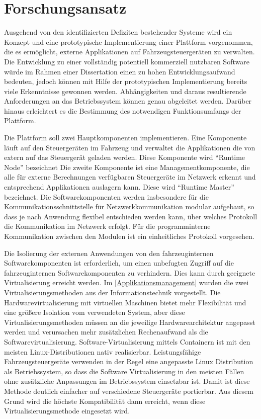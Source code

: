 \section{Forschungsansatz}
Ausgehend von den identifizierten Defiziten bestehender Systeme wird ein Konzept und eine prototypische Implementierung einer Plattform vorgenommen, die es ermöglicht, externe Applikationen auf Fahrzeugsteuergeräten zu verwalten. Die Entwicklung zu einer vollständig potentiell kommerziell nutzbaren Software würde im Rahmen einer Dissertation einen zu hohen Entwicklungsaufwand bedeuten, jedoch können mit Hilfe der prototypischen Implementierung bereits viele Erkenntnisse gewonnen werden. Abhängigkeiten und daraus resultierende Anforderungen an das Betriebssystem können genau abgeleitet werden. Darüber hinaus erleichtert es die Bestimmung des notwendigen Funktionsumfangs der Plattform. 

Die Plattform soll zwei Hauptkomponenten implementieren. Eine Komponente läuft auf den Steuergeräten im Fahrzeug und verwaltet die Applikationen die von extern auf das Steuergerät geladen werden. Diese Komponente wird \enquote{Runtime Node} bezeichnet Die zweite Komponente ist eine Managementkomponente, die alle für externe Berechnungen verfügbaren Steuergeräte im Netzwerk erkennt und entsprechend Applikationen auslagern kann. Diese wird \enquote{Runtime Master} bezeichnet. Die Softwarekomponenten werden insbesondere für die Kommunikationsschnittstelle für Netzwerkkommunikation modular aufgebaut, so dass je nach Anwendung flexibel entschieden werden kann, über welches Protokoll die Kommunikation im Netzwerk erfolgt. Für die programminterne Kommunikation zwischen den Modulen ist ein einheitliches Protokoll vorgesehen. 

Die Isolierung der externen Anwendungen von den fahrzeuginternen Softwarekomponenten ist erforderlich, um einen unbefugten Zugriff auf die fahrzeuginternen Softwarekomponenten zu verhindern. Dies kann durch geeignete Virtualisierung erreicht werden. Im \autoref{Applikationsmanagement} wurden die zwei Virtualisierungsmethoden aus der Informationstechnik vorgestellt. Die Hardwarevirtualisierung mit virtuellen Maschinen bietet mehr Flexibilität und eine größere Isolation vom verwendeten System, aber diese Virtualisierungsmethoden müssen an die jeweilige Hardwarearchitektur angepasst werden und verursachen mehr zusätzlichen Rechenaufwand als die Softwarevirtualisierung. Software-Virtualisierung mittels Containern ist mit den meisten Linux-Distributionen nativ realisierbar. Leistungsfähige Fahrzeugsteuergeräte verwenden in der Regel eine angepasste Linux Distribution als Betriebssystem, so dass die Software Virtualisierung in den meisten Fällen ohne zusätzliche Anpassungen im Betriebssystem einsetzbar ist. Damit ist diese Methode deutlich einfacher auf verschiedene Steuergeräte portierbar. Aus diesem Grund wird die höchste Kompatibilität dann erreicht, wenn diese Virtualisierungsmethode eingesetzt wird. 

